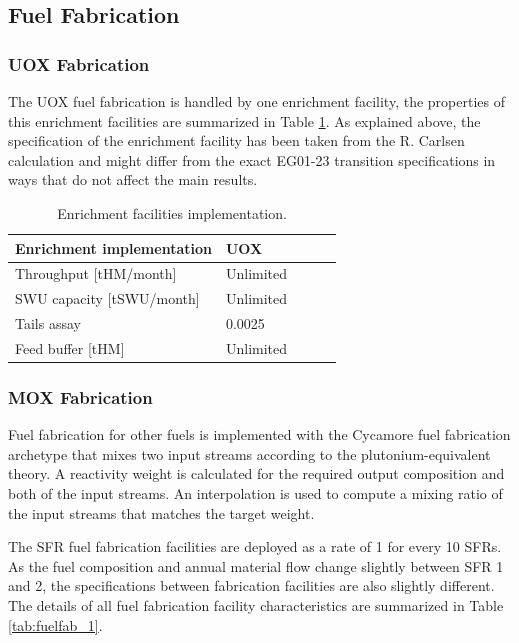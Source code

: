 \documentclass[12pt]{article}
\begin{document}
\subsection{Fuel Fabrication}

\subsubsection{UOX Fabrication}

The UOX fuel fabrication is handled by one enrichment facility, the properties
of this enrichment facilities are summarized in Table \ref{tab:enrich_1}. As
explained above, the specification of the enrichment facility has been taken from the
R. Carlsen calculation and might differ from the exact EG01-23 transition
specifications in ways that do not affect the main results.

\begin{table}[h!]
    \centering
    \begin{tabular}{lllll}
    \hline
    Enrichment implementation  &  UOX        \\
    \hline
    Throughput [tHM/month]     &  Unlimited  \\
    SWU capacity [tSWU/month]  &  Unlimited  \\
    Tails assay                &  0.0025     \\
    Feed buffer [tHM]          &  Unlimited  \\
    \hline
    \end{tabular}
    \caption{Enrichment facilities implementation. }
    \label{tab:enrich_1}
\end{table}

\subsubsection{MOX Fabrication}

Fuel fabrication for other fuels is implemented with the Cycamore fuel
fabrication archetype that mixes two input streams according to the
plutonium-equivalent theory\cite{Pueq}. A reactivity weight is calculated for
the required output composition and both of the input streams. An interpolation
is used to compute a mixing ratio of the input streams that matches the target
weight.

The SFR fuel fabrication facilities are deployed as a rate of 1 for every 10
SFRs.  As the fuel composition and annual material flow change slightly between
SFR 1 and 2, the specifications between fabrication facilities are also slightly
different. The details of all fuel fabrication facility characteristics are
summarized in Table \ref{tab:fuelfab_1}.
\end{document}
